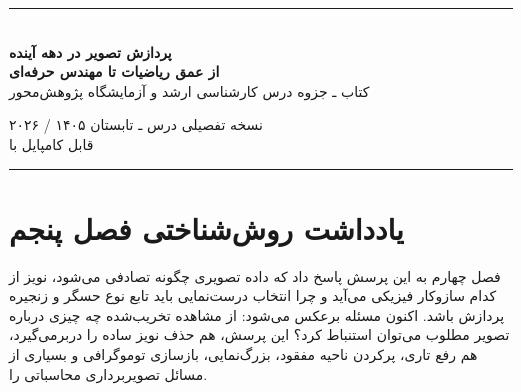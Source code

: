 \documentclass[12pt,openany,oneside]{book}
\begin{document}
\begin{titlepage}
\centering
\vspace*{0.9cm}
{\color{DeepBlue}\rule{0.9\textwidth}{1.1pt}}\\[1.0cm]
{\Huge\bfseries پردازش تصویر در دهه آینده\\[0.3cm]}
{\LARGE\bfseries از عمق ریاضیات تا مهندس حرفه‌ای\\[0.85cm]}
{\Large کتاب ـ جزوه درس کارشناسی ارشد و آزمایشگاه پژوهش‌محور\\[1.1cm]}


\vfill
{\large نسخه تفصیلی درس ـ تابستان ۱۴۰۵ / ۲۰۲۶}\\[0.4cm]
{\normalsize قابل کامپایل با }\\[0.8cm]
{\color{DeepBlue}\rule{0.9\textwidth}{1.1pt}}
\end{titlepage}

\frontmatter

\chapter*{یادداشت روش‌شناختی فصل پنجم}

فصل چهارم به این پرسش پاسخ داد که داده تصویری چگونه تصادفی می‌شود، نویز از کدام سازوکار فیزیکی می‌آید
و چرا انتخاب درست‌نمایی باید تابع نوع حسگر و زنجیره پردازش باشد. اکنون مسئله برعکس می‌شود:
از مشاهده تخریب‌شده چه چیزی درباره تصویر مطلوب می‌توان استنباط کرد؟ این پرسش، هم حذف نویز ساده را دربرمی‌گیرد،
هم رفع تاری، پرکردن ناحیه مفقود، بزرگ‌نمایی، بازسازی توموگرافی و بسیاری از مسائل تصویربرداری محاسباتی را.
\end{document}
